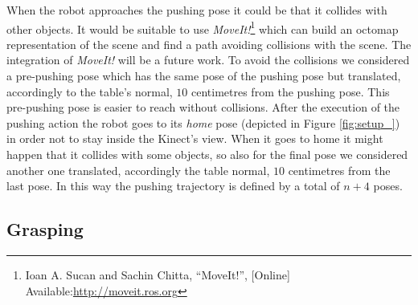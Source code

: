 When the robot approaches the pushing pose it could be that it collides with other objects. It would be suitable to use \textit{MoveIt!}\footnote{Ioan A. Sucan and Sachin Chitta, “MoveIt!”, [Online] Available:\href{http://moveit.ros.org} {\url{http://moveit.ros.org}}} which can build an octomap representation of the scene and find a path avoiding collisions with the scene. The integration of \textit{MoveIt!} will be a future work. To avoid the collisions we considered a pre-pushing pose which has the same pose of the pushing pose but translated, accordingly to the table's normal, $10$ centimetres from the pushing pose. This pre-pushing pose is easier to reach without collisions. 
After the execution of the pushing action the robot goes to its \textit{home} pose (depicted in Figure \ref{fig:setup_}) in order not to stay inside the Kinect's view. When it goes to home it might happen that it collides with some objects, so also for the final pose we considered another one translated, accordingly the table normal, $10$ centimetres from the last pose. 
In this way the pushing trajectory is defined by a total of $n+4$ poses. 




\subsection{Grasping}
\label{sec:grasping}


